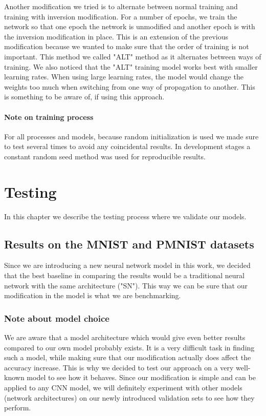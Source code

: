 \documentclass[b5paper]{book}
\begin{document}
Another modification we tried is to alternate between normal training and training with inversion modification. For a number of epochs, we train the network so that one epoch the network is unmodified and another epoch is with the inversion modification in place. This is an extension of the previous modification because we wanted to make sure that the order of training is not important. This method we called "ALT" method as it alternates between ways of training. We also noticed that the "ALT" training model works best with smaller learning rates. When using large learning rates, the model would change the weights too much when switching from one way of propagation to another. This is something to be aware of, if using this approach.

\subsubsection{Note on training process}

For all processes and models, because random initialization is used we made sure to test several times to avoid any coincidental results. In development stages a constant random seed method was used for reproducible results.



\chapter{Testing}

In this chapter we describe the testing process where we validate our models.

\section{Results on the MNIST and PMNIST datasets}

Since we are introducing a new neural network model in this work, we decided that the best baseline in comparing the results would be a traditional neural network with the same architecture ("SN"). This way we can be sure that our modification in the model is what we are benchmarking.

\subsection{Note about model choice} \label{modelchoice}

We are aware that a model architecture which would give even better results compared to our own model probably exists. It is a very difficult task in finding such a model, while making sure that our modification actually does affect the accuracy increase. This is why we decided to test our approach on a very well-known model to see how it behaves. Since our modification is simple and can be applied to any CNN model, we will definitely experiment with other models (network architectures) on our newly introduced validation sets to see how they perform.
\end{document}
